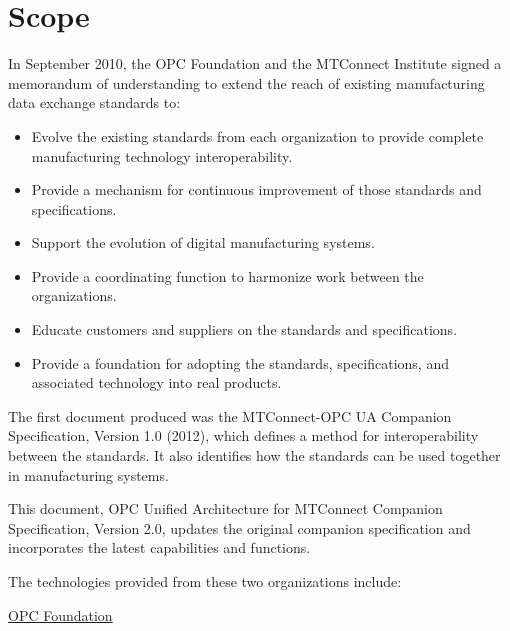 \section{Scope}\label{scope}

In September 2010, the OPC Foundation and the MTConnect Institute signed a memorandum of understanding to extend the reach of existing manufacturing data exchange standards to:

\begin{itemize}
    \item Evolve the existing standards from each organization to provide complete manufacturing technology interoperability.
    \item Provide a mechanism for continuous improvement of those standards and specifications.
    \item Support the evolution of digital manufacturing systems.  
    \item Provide a coordinating function to harmonize work between the organizations.
    \item Educate customers and suppliers on the standards and specifications.
    \item Provide a foundation for adopting the standards, specifications, and associated technology into real products.
\end{itemize}

The first document produced was the MTConnect-OPC UA Companion Specification, Version 1.0 (2012), which defines a method for interoperability between the standards. It also identifies how the standards can be used together in manufacturing systems.

This document, OPC Unified Architecture for MTConnect Companion Specification, Version 2.0, updates the original companion specification and incorporates the latest capabilities and functions.   

The technologies provided from these two organizations include:

\quad\underline{OPC Foundation}

